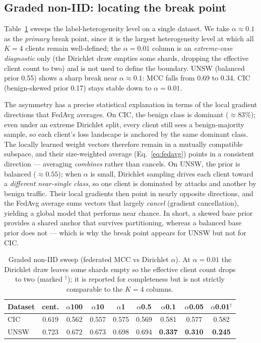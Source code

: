 \documentclass[11pt,a4paper]{article}
\begin{document}
\subsection{Graded non-IID: locating the break point}
\label{sec:bridge}
Table~\ref{tab:bridge} sweeps the label-heterogeneity level on a single dataset.
We take \(\alpha\approx0.1\) as the \emph{primary} break point, since it is the
largest heterogeneity level at which all \(K=4\) clients remain well-defined; the
\(\alpha=0.01\) column is an \emph{extreme-case diagnostic} only (the Dirichlet
draw empties some shards, dropping the effective client count to two) and is not
used to define the boundary.
UNSW (balanced prior 0.55) shows a sharp break near \(\alpha\approx0.1\): MCC
falls from 0.69 to 0.34. CIC (benign-skewed prior 0.17) stays stable down to
\(\alpha=0.01\).

The asymmetry has a precise statistical explanation in terms of the local gradient
directions that FedAvg averages. On CIC, the benign class is dominant
(\(\approx 83\%\)); even under an extreme Dirichlet split, every client still sees
a benign-majority sample, so each client's loss landscape is anchored by the same
dominant class. The locally learned weight vectors therefore remain in a mutually
compatible subspace, and their size-weighted average (Eq.~\ref{eq:fedavg}) points
in a consistent direction --- averaging \emph{combines} rather than cancels. On
UNSW, the prior is balanced (\(\approx 0.55\)); when \(\alpha\) is small, Dirichlet
sampling drives each client toward a \emph{different near-single class}, so one
client is dominated by attacks and another by benign traffic. Their local gradients
then point in nearly opposite directions, and the FedAvg average sums vectors that
largely \emph{cancel} (gradient cancellation), yielding a global model that
performs near chance. In short, a skewed base prior provides a shared anchor that
survives partitioning, whereas a balanced base prior does not --- which is why the
break point appears for UNSW but not for CIC.

\begin{table}[htbp]
\centering\small
\caption{Graded non-IID sweep (federated MCC vs Dirichlet $\alpha$). At
$\alpha=0.01$ the Dirichlet draw leaves some shards empty so the effective client
count drops to two (marked $^\dagger$); it is reported for completeness but is not
strictly comparable to the $K=4$ columns.}
\label{tab:bridge}
\begin{tabular}{@{}lcccccccc@{}}
\toprule
Dataset & cent. & $\alpha$100 & $\alpha$10 & $\alpha$1 & $\alpha$0.5 & $\alpha$0.1 & $\alpha$0.05 & $\alpha$0.01$^\dagger$ \\
\midrule
CIC  & 0.619 & 0.562 & 0.557 & 0.575 & 0.569 & 0.581 & 0.577 & 0.582 \\
UNSW & 0.723 & 0.672 & 0.673 & 0.698 & 0.694 & \textbf{0.337} & \textbf{0.310} & \textbf{0.245} \\
\bottomrule
\end{tabular}
\end{table}
\end{document}
